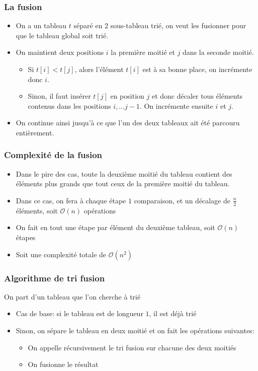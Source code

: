 \documentclass[aspectratio=169]{beamer}
\begin{document}
\begin{frame}
  \frametitle{La fusion}

  \begin{itemize}
  \item On a un tableau \(t\) séparé en \(2\) sous-tableau trié, on veut les fusionner
    pour que le tableau global soit trié.
  \item On maintient deux positions \(i\) la première moitié et \(j\) dans la
    seconde moitié.
    \begin{itemize}
    \item Si \(t[i] < t[j]\), alors l'élément \(t[i]\) est à sa bonne place, on
      incrémente donc \(i\).
    \item Sinon, il faut insérer \(t[j]\) en position \(j\) et donc décaler tous
      éléments contenus dans les positions \(i,\ldots j-1\). On incrémente
      ensuite \(i\) et \(j\).
    \end{itemize}
  \item On continue ainsi jusqu'à ce que l'un des deux tableaux ait été parcouru
    entièrement.
  \end{itemize}
\end{frame}

\begin{frame}
  \frametitle{Complexité de la fusion}

  \begin{itemize}
  \item Dans le pire des cas, toute la deuxième moitié du tableau contient des
    éléments plus grands que tout ceux de la première moitié du tableau.
  \item Dans ce cas, on fera à chaque étape \(1\) comparaison, et un décalage de
    \(\frac{n}{2}\) éléments, soit \(\mathcal{O}(n)\) opérations
  \item On fait en tout une étape par élément du deuxième tableau, soit
    \(\mathcal{O}(n)\) étapes
  \item Soit une complexité totale de \(\mathcal{O}(n^{2})\)
  \end{itemize}
\end{frame}

\begin{frame}
    \frametitle{Algorithme de tri fusion}
    On part d'un tableau que l'on cherche à trié

    \begin{itemize}
    \item Cas de base: si le tableau est de longueur \(1\), il est déjà trié
    \item Sinon, on sépare le tableau en deux moitié et on fait les opérations
      suivantes:
      \begin{itemize}
      \item On appelle récursivement le tri fusion sur chacune des deux moitiés
      \item On fusionne le résultat
      \end{itemize}
    \end{itemize}

\end{frame}
\end{document}
